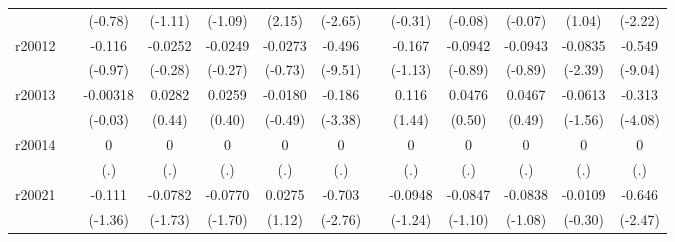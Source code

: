 {\begin{tabular}{l*{12}{c}}
            &                     &     (-0.78)         &     (-1.11)         &     (-1.09)         &      (2.15)         &     (-2.65)         &                     &     (-0.31)         &     (-0.08)         &     (-0.07)         &      (1.04)         &     (-2.22)         \\
[1em]
r20012      &                     &      -0.116         &     -0.0252         &     -0.0249         &     -0.0273         &      -0.496\sym{***}&                     &      -0.167         &     -0.0942         &     -0.0943         &     -0.0835\sym{*}  &      -0.549\sym{***}\\
            &                     &     (-0.97)         &     (-0.28)         &     (-0.27)         &     (-0.73)         &     (-9.51)         &                     &     (-1.13)         &     (-0.89)         &     (-0.89)         &     (-2.39)         &     (-9.04)         \\
[1em]
r20013      &                     &    -0.00318         &      0.0282         &      0.0259         &     -0.0180         &      -0.186\sym{**} &                     &       0.116         &      0.0476         &      0.0467         &     -0.0613         &      -0.313\sym{***}\\
            &                     &     (-0.03)         &      (0.44)         &      (0.40)         &     (-0.49)         &     (-3.38)         &                     &      (1.44)         &      (0.50)         &      (0.49)         &     (-1.56)         &     (-4.08)         \\
[1em]
r20014      &                     &           0         &           0         &           0         &           0         &           0         &                     &           0         &           0         &           0         &           0         &           0         \\
            &                     &         (.)         &         (.)         &         (.)         &         (.)         &         (.)         &                     &         (.)         &         (.)         &         (.)         &         (.)         &         (.)         \\
[1em]
r20021      &                     &      -0.111         &     -0.0782         &     -0.0770         &      0.0275         &      -0.703\sym{**} &                     &     -0.0948         &     -0.0847         &     -0.0838         &     -0.0109         &      -0.646\sym{*}  \\
            &                     &     (-1.36)         &     (-1.73)         &     (-1.70)         &      (1.12)         &     (-2.76)         &                     &     (-1.24)         &     (-1.10)         &     (-1.08)         &     (-0.30)         &     (-2.47)         \\

\end{tabular}}
